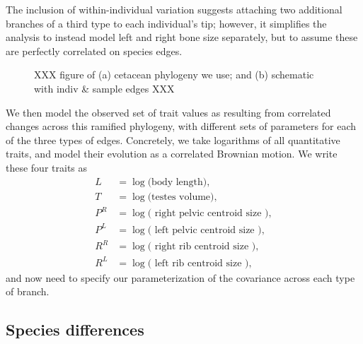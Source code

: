 \documentclass{article}
\begin{document}
The inclusion of within-individual variation suggests attaching two additional branches of a third type
to each individual's tip;
however, it simplifies the analysis to instead model left and right bone size separately,
but to assume these are perfectly correlated on species edges.

\begin{figure}
XXX figure of (a) cetacean phylogeny we use; and (b) schematic with indiv \& sample edges XXX
\end{figure}

We then model the observed set of trait values as resulting from correlated changes across this ramified phylogeny,
with different sets of parameters for each of the three types of edges.
Concretely, we take logarithms of all quantitative traits,
and model their evolution as a correlated Brownian motion.
We write these four traits as
\begin{align}
    L &= \log \text{(body length)}, \\
    T &= \log \text{(testes volume)}, \\
    P^R &= \log \text{( right pelvic centroid size )}, \\
    P^L &= \log \text{( left pelvic centroid size )}, \\
    R^R &= \log \text{( right rib centroid size )}, \\
    R^L &= \log \text{( left rib centroid size )},
\end{align}
and now need to specify our parameterization of the covariance across each type of branch.

\subsection{Species differences}
\end{document}
